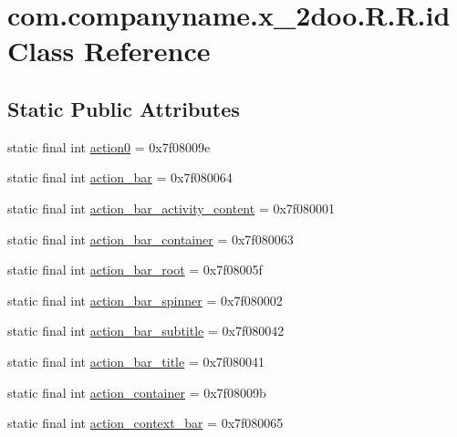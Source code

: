 \hypertarget{classcom_1_1companyname_1_1x__2doo_1_1_r_1_1id}{
\section{com.companyname.x\_\-2doo.R.R.id Class Reference}
\label{classcom_1_1companyname_1_1x__2doo_1_1_r_1_1id}
}
\subsection*{Static Public Attributes}
\begin{CompactItemize}
\item 
static final int \hyperlink{classcom_1_1companyname_1_1x__2doo_1_1_r_1_1id_97e848e58d1b699262f6a8d4e22a952d}{action0} = 0x7f08009e
\item 
static final int \hyperlink{classcom_1_1companyname_1_1x__2doo_1_1_r_1_1id_4d499f2ae1478dd0b26e7d7ebe739457}{action\_\-bar} = 0x7f080064
\item 
static final int \hyperlink{classcom_1_1companyname_1_1x__2doo_1_1_r_1_1id_a21ca803d2ee398af617cbe51e1a6c64}{action\_\-bar\_\-activity\_\-content} = 0x7f080001
\item 
static final int \hyperlink{classcom_1_1companyname_1_1x__2doo_1_1_r_1_1id_c3e47ff991a319278382a6f684619514}{action\_\-bar\_\-container} = 0x7f080063
\item 
static final int \hyperlink{classcom_1_1companyname_1_1x__2doo_1_1_r_1_1id_74291bbc5d9809282250ee8f4d632a7c}{action\_\-bar\_\-root} = 0x7f08005f
\item 
static final int \hyperlink{classcom_1_1companyname_1_1x__2doo_1_1_r_1_1id_48253f2c379cb4a26c789c8b46cb2027}{action\_\-bar\_\-spinner} = 0x7f080002
\item 
static final int \hyperlink{classcom_1_1companyname_1_1x__2doo_1_1_r_1_1id_78af7eddecae5e0cece59d9d65d95036}{action\_\-bar\_\-subtitle} = 0x7f080042
\item 
static final int \hyperlink{classcom_1_1companyname_1_1x__2doo_1_1_r_1_1id_a48beed314fd3180593d9e6a1298cae5}{action\_\-bar\_\-title} = 0x7f080041
\item 
static final int \hyperlink{classcom_1_1companyname_1_1x__2doo_1_1_r_1_1id_d61d8f1cedaafb8a2673d18f613cb826}{action\_\-container} = 0x7f08009b
\item 
static final int \hyperlink{classcom_1_1companyname_1_1x__2doo_1_1_r_1_1id_54174200cee8c3b4d0e3dc43e9139cec}{action\_\-context\_\-bar} = 0x7f080065

\end{CompactItemize}
